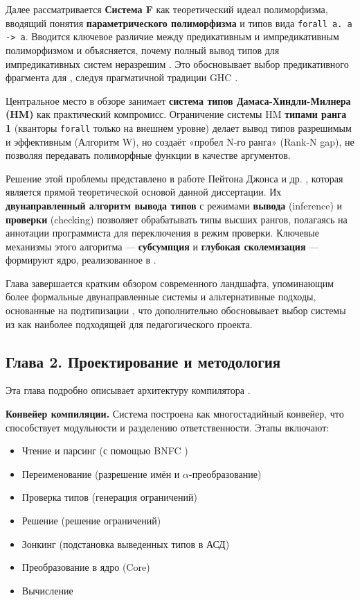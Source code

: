 Далее рассматривается \textbf{Система F} \cite{girard-system-f} как теоретический идеал полиморфизма, вводящий понятия \textbf{параметрического полиморфизма} и типов вида \texttt{forall a. a -> a}. Вводится ключевое различие между предикативным и импредикативным полиморфизмом и объясняется, почему полный вывод типов для импредикативных систем неразрешим \cite{wells-typability-1999, serrano-quick-2020}. Это обосновывает выбор предикативного фрагмента для \Arralac, следуя прагматичной традиции GHC \cite{jones-practical-2007}.

Центральное место в обзоре занимает \textbf{система типов Дамаса-Хиндли-Милнера (HM)} \cite{damas-milner} как практический компромисс. Ограничение системы HM \textbf{типами ранга 1} (кванторы \texttt{forall} только на внешнем уровне) делает вывод типов разрешимым и эффективным (Алгоритм W), но создаёт «пробел N-го ранга» (Rank-N gap), не позволяя передавать полиморфные функции в качестве аргументов.

Решение этой проблемы представлено в работе Пейтона Джонса и др. \cite{jones-practical-2007}, которая является прямой теоретической основой данной диссертации. Их \textbf{двунаправленный алгоритм вывода типов} с режимами \textbf{вывода} (inference) и \textbf{проверки} (checking) позволяет обрабатывать типы высших рангов, полагаясь на аннотации программиста для переключения в режим проверки. Ключевые механизмы этого алгоритма — \textbf{субсумпция} и \textbf{глубокая сколемизация} — формируют ядро, реализованное в \Arralac.

Глава завершается кратким обзором современного ландшафта, упоминающим более формальные двунаправленные системы \cite{dunfield-complete-2013, dunfield-bidirectional-2020} и альтернативные подходы, основанные на подтипизации \cite{parreaux-when-2024}, что дополнительно обосновывает выбор системы из \cite{jones-practical-2007} как наиболее подходящей для педагогического проекта.

\newpage

\subsection*{Глава 2. Проектирование и методология}

Эта глава подробно описывает архитектуру компилятора \Arralac.

\textbf{Конвейер компиляции.} Система построена как многостадийный конвейер, что способствует модульности и разделению ответственности. Этапы включают:
\begin{itemize}
    \item Чтение и парсинг (с помощью BNFC \cite{bnfc-site-2025})
    \item Переименование (разрешение имён и $\alpha$-преобразование)
    \item Проверка типов (генерация ограничений)
    \item Решение (решение ограничений)
    \item Зонкинг (подстановка выведенных типов в АСД)
    \item Преобразование в ядро (Core)
    \item Вычисление
\end{itemize}

